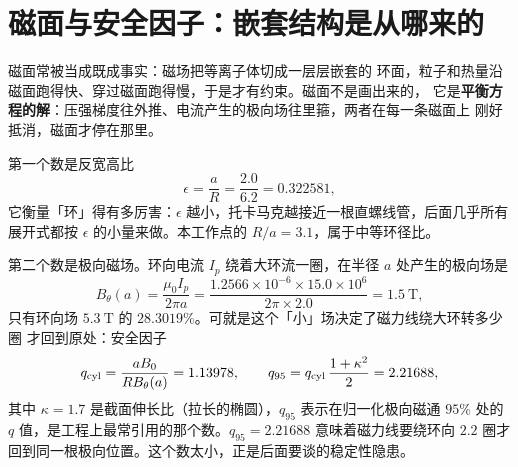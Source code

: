 %

\section{磁面与安全因子：嵌套结构是从哪来的}
\label{sec:app-ag-surfaces}

磁面常被当成既成事实：磁场把等离子体切成一层层嵌套的
环面，粒子和热量沿磁面跑得快、穿过磁面跑得慢，于是才有约束。磁面不是画出来的，
它是\textbf{平衡方程的解}：压强梯度往外推、电流产生的极向场往里箍，两者在每一条磁面上
刚好抵消，磁面才停在那里。

第一个数是反宽高比
\begin{equation}
\epsilon = \frac{a}{R} = \frac{2.0}{6.2} = 0.322581,
\label{eq:app-ag-epsilon}
\end{equation}
它衡量「环」得有多厉害：$\epsilon$ 越小，托卡马克越接近一根直螺线管，后面几乎所有
展开式都按 $\epsilon$ 的小量来做。本工作点的 $R/a = 3.1$，属于中等环径比。

第二个数是极向磁场。环向电流 $I_p$ 绕着大环流一圈，在半径 $a$ 处产生的极向场是
\begin{equation}
B_\theta(a) = \frac{\mu_0 I_p}{2\pi a} = \frac{1.2566\times10^{-6}\times15.0\times10^{6}}
{2\pi\times2.0} = 1.5\ \mathrm{T},
\label{eq:app-ag-btheta}
\end{equation}
只有环向场 $5.3\ \mathrm{T}$ 的 $28.3019\%$。可就是这个「小」场决定了磁力线绕大环转多少圈
才回到原处：安全因子
\begin{equation}
q_{\rm cyl} = \frac{a B_0}{R B_\theta(a)} = 1.13978,
\qquad
q_{95} = q_{\rm cyl}\,\frac{1+\kappa^2}{2} = 2.21688,
\label{eq:app-ag-q95}
\end{equation}
其中 $\kappa=1.7$ 是截面伸长比（拉长的椭圆），$q_{95}$ 表示在归一化极向磁通 $95\%$
处的 $q$ 值，是工程上最常引用的那个数。$q_{95}=2.21688$ 意味着磁力线要绕环向
$2.2$ 圈才回到同一根极向位置。这个数太小，正是后面要谈的稳定性隐患。


